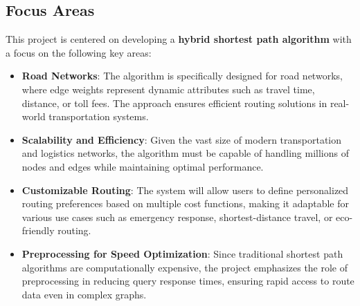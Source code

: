 	\subsection{Focus Areas}
	This project is centered on developing a \textbf{hybrid shortest path algorithm} with a focus on the following key areas:
	\begin{itemize}
		\item \textbf{Road Networks}: The algorithm is specifically designed for road networks, where edge weights represent dynamic attributes such as travel time, distance, or toll fees. The approach ensures efficient routing solutions in real-world transportation systems.
		\item \textbf{Scalability and Efficiency}: Given the vast size of modern transportation and logistics networks, the algorithm must be capable of handling millions of nodes and edges while maintaining optimal performance.
		\item \textbf{Customizable Routing}: The system will allow users to define personalized routing preferences based on multiple cost functions, making it adaptable for various use cases such as emergency response, shortest-distance travel, or eco-friendly routing.
		\item \textbf{Preprocessing for Speed Optimization}: Since traditional shortest path algorithms are computationally expensive, the project emphasizes the role of preprocessing in reducing query response times, ensuring rapid access to route data even in complex graphs.
	\end{itemize}

